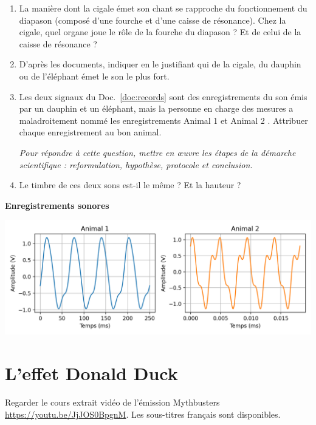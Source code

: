 \documentclass[12pt,a4paper]{article}
\begin{document}
\begin{enumerate}
\item La manière dont la cigale émet son chant se rapproche du fonctionnement du diapason (composé d'une fourche et d'une caisse de résonance).
Chez la cigale, quel organe joue le rôle de la fourche du diapason ?
Et de celui de la caisse de résonance ?

\item D'après les documents, indiquer en le justifiant qui de la cigale, du dauphin ou de l'éléphant émet le son le plus fort.

\item Les deux signaux du Doc.~\ref{doc:records} sont des enregistrements du son émis par un dauphin et un éléphant, mais la personne en charge des mesures a maladroitement nommé les enregistrements \og Animal 1 \fg{} et \og Animal 2 \fg{}.
Attribuer chaque enregistrement au bon animal.

\emph{Pour répondre à cette question, mettre en œuvre les étapes de la démarche scientifique : reformulation, hypothèse, protocole et conclusion.}

\item Le timbre de ces deux sons est-il le même ?
Et la hauteur ?
\end{enumerate}

\begin{doc}
\label{doc:records}
\textbf{Enregistrements sonores}

\noindent
\includegraphics[width=\textwidth]{images/animals.png}
\end{doc}

\section*{L'effet Donald Duck}

Regarder le cours extrait vidéo de l'émission Mythbusters \href{https://youtu.be/JjJOS0BpgnM}{https://youtu.be/JjJOS0BpgnM}.
Les sous-titres français sont disponibles.
\end{document}
